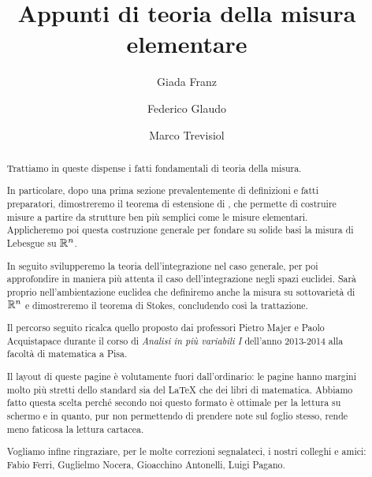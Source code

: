 \documentclass[a4paper,12pt]{article}
\title{Appunti di teoria della misura elementare}
\author{Giada Franz \and Federico Glaudo \and Marco Trevisiol}
\begin{document}
\maketitle

\begin{abstract}
	Trattiamo in queste dispense i fatti fondamentali di teoria della misura.
	
	In particolare, dopo una prima sezione prevalentemente di definizioni e fatti preparatori, dimostreremo il teorema di estensione di \carat{}, che permette di costruire misure a partire da strutture ben più semplici come le misure elementari. Applicheremo poi questa costruzione generale per fondare su solide basi la misura di Lebesgue su $\mathbb R^n$.
	
	In seguito svilupperemo la teoria dell'integrazione nel caso generale, per poi approfondire in maniera più attenta il caso dell'integrazione negli spazi euclidei. Sarà proprio nell'ambientazione euclidea che definiremo anche la misura su sottovarietà di $\mathbb R^n$ e dimostreremo il teorema di Stokes, concludendo così la trattazione.
	
	Il percorso seguito ricalca quello proposto dai professori Pietro Majer e Paolo Acquistapace durante il corso di \textit{Analisi in più variabili I} dell'anno 2013-2014 alla facoltà di matematica a Pisa.
	
	Il layout di queste pagine è volutamente fuori dall'ordinario: le pagine hanno margini molto più stretti dello standard sia del \LaTeX{} che dei libri di matematica. 
	Abbiamo fatto questa scelta perché secondo noi questo formato è ottimale per la lettura su schermo e in quanto, pur non permettendo di prendere note sul foglio stesso, rende meno faticosa la lettura cartacea.
	
	Vogliamo infine ringraziare, per le molte correzioni segnalateci, i nostri colleghi e amici: Fabio Ferri, Guglielmo Nocera, Gioacchino Antonelli, Luigi Pagano.
\end{abstract}
\clearpage

\tableofcontents
\clearpage











\printindex
\end{document}
